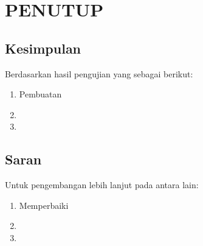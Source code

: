 \chapter{PENUTUP}


\section{Kesimpulan}
\label{section:kesimpulan}

Berdasarkan hasil pengujian yang \lipsum[1][1-3] sebagai berikut:

\begin{enumerate}[nolistsep]

  \item Pembuatan \lipsum[2][1-3]

  \item \lipsum[2][4-6]

  \item \lipsum[2][7-10]

\end{enumerate}

\section{Saran}
\label{chap:saran}

Untuk pengembangan lebih lanjut pada \lipsum[1][1-3] antara lain:

\begin{enumerate}[nolistsep]

  \item Memperbaiki \lipsum[2][1-3]

  \item \lipsum[2][4-6]

  \item \lipsum[2][7-10]

\end{enumerate}

